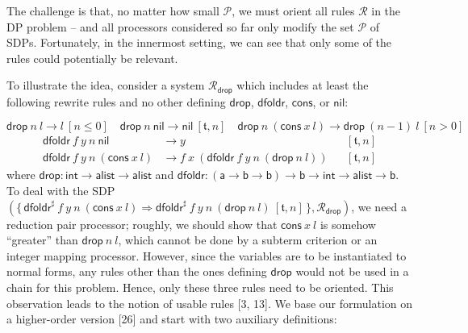 \documentclass[10pt,a4paper]{amsart}
\begin{document}
 
 
The challenge is that, no matter how small $\mathcal{P}$, we must orient all rules $\mathcal{R}$ in the DP problem – and all processors considered so far only modify the set $\mathcal{P}$ of SDPs. Fortunately, in the innermost setting, we can see that only some of the rules could potentially be relevant.\par
 
 
 
To illustrate the idea, consider a system $\mathcal{R}_{\mathsf{drop}}$ which includes at least the following rewrite rules and no other defining $\mathsf{drop}$, $\mathsf{dfoldr}$, $\mathsf{cons}$, or $\mathsf{nil}$:\par
    \[\displaystyle{{{\mathsf{drop}}\ {n}}\ {l}}\rightarrow{l}\ [n\leq 0]\quad{{{\mathsf{drop}}\ {n}}\ {\mathsf{nil}}}\rightarrow{\mathsf{nil}}\ [\mathfrak{t},n]\quad{{{\mathsf{drop}}\ {n}}\ {({{\mathsf{cons}}\ {x}}\ {l})}}\rightarrow{{{\mathsf{drop}}\ {(n-1)}}\ {l}}\ [n>0]\]     \[\displaystyle\begin{aligned} {{{{\mathsf{dfoldr}}\ {f}}\ {y}}\ {n}}\ {\mathsf{nil}}&\rightarrow y&&[\mathfrak{t},n]\\
{{{{\mathsf{dfoldr}}\ {f}}\ {y}}\ {n}}\ {({{\mathsf{cons}}\ {x}}\ {l})}&\rightarrow{{f}\ {x}}\ {({{{{\mathsf{dfoldr}}\ {f}}\ {y}}\ {n}}\ {({{\mathsf{drop}}\ {n}}\ {l})})}&&[\mathfrak{t},n]\end{aligned}\]    
where $\mathsf{drop}:\mathsf{int}\rightarrow\mathsf{alist}\rightarrow\mathsf{alist}$ and $\mathsf{dfoldr}:(\mathsf{a}\rightarrow\mathsf{b}\rightarrow\mathsf{b})\rightarrow\mathsf{b}\rightarrow\mathsf{int}\rightarrow\mathsf{alist}\rightarrow\mathsf{b}$. To deal with the SDP $(\{\,{{{{{\mathsf{dfoldr}^{\sharp}}\ {f}}\ {y}}\ {n}}\ {({{\mathsf{cons}}\ {x}}\ {l})}}\Rightarrow{{{{{\mathsf{dfoldr}^{\sharp}}\ {f}}\ {y}}\ {n}}\ {({{\mathsf{drop}}\ {n}}\ {l})}}\ [\mathfrak{t},n]\,\},\mathcal{R}_{\mathsf{drop}})$, we need a reduction pair processor; roughly, we should show that ${{\mathsf{cons}}\ {x}}\ {l}$ is somehow “greater” than ${{\mathsf{drop}}\ {n}}\ {l}$, which cannot be done by a subterm criterion or an integer mapping processor. However, since the variables are to be instantiated to normal forms, any rules other than the ones defining $\mathsf{drop}$ would not be used in a chain for this problem. Hence, only these three rules need to be oriented. This observation leads to the notion of usable rules [3, 13]. We base our formulation on a higher-order version [26] and start with two auxiliary definitions:\par
 
\end{document}
